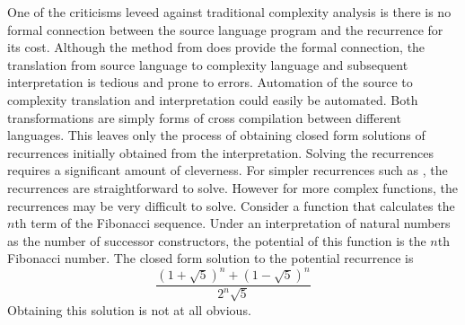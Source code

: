 One of the criticisms leveed against traditional complexity analysis is there
is no formal connection between the source language program and the recurrence
for its cost. Although the method from \citet{Danner2015} does provide the
formal connection, the translation from source language to complexity language
and subsequent interpretation is tedious and prone to errors. Automation of the
source to complexity translation and interpretation could easily be automated.
Both transformations are simply forms of cross compilation between different
languages. This leaves only the process of obtaining closed form solutions of
recurrences initially obtained from the interpretation. Solving the recurrences
requires a significant amount of cleverness. For simpler recurrences such as
, the recurrences are straightforward to solve. However for more
complex functions, the recurrences may be very difficult to solve. Consider a
function that calculates the $n$th term of the Fibonacci sequence. Under an
interpretation of natural numbers as the number of successor constructors, the
potential of this function is the $n$th Fibonacci number. The closed form
solution to the potential recurrence is
\[
  \frac{(1 + \sqrt{5})^n + (1 - \sqrt{5})^n}{2^n\sqrt{5}}
\]
Obtaining this solution is not at all obvious.
